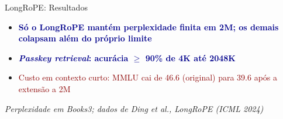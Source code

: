 \documentclass[aspectratio=169, xcolor=dvipsnames]{beamer}
\begin{document}
  \begin{frame}{LongRoPE: Resultados}
    \centering

    \flushleft
    \begin{itemize}
      \item \textcolor{DarkBlue}{\textbf{Só o LongRoPE mantém perplexidade finita em 2M; os demais colapsam além do próprio limite}}
      \item \textcolor{DarkBlue}{\textbf{\textit{Passkey retrieval}: acurácia $\ge$ 90\% de 4K até 2048K}}
      \item \textcolor{DarkRed}{Custo em contexto curto: MMLU cai de 46.6 (original) para 39.6 após a extensão a 2M}
    \end{itemize}

    {\scriptsize\textit{Perplexidade em Books3; dados de Ding et al., LongRoPE (ICML 2024)}}
  \end{frame}
\end{document}
